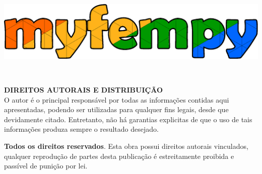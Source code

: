 \documentclass[
	14pt,				%
	openright,			%
	oneside
	a4paper,			%
	chapter=TITLE,		%
	section=TITLE,		%
	subsection=TITLE,	%
	subsubsection=TITLE,%
	english,			%
	french,				%
	spanish,			%
	brazil,				%
	sumario=tradicional
]{abntex2}
\begin{document}
\begin{titlingpage}
	
\phantom{xxx}
\vspace{0.5cm}
\huge
\raggedright
\centering 

\begin{center}
	\includegraphics[width=1\linewidth]{capa_v1}
\end{center}

\clearpage
\ABNTEXfontereduzida
\imprimirpreambulo\\
\vspace{1.0cm}
\raggedright
{\large \textbf{DIREITOS AUTORAIS E DISTRIBUIÇÃO}}\\
\vspace{0.5cm}
O autor é o principal responsável por todas as informações contidas aqui apresentadas, podendo ser utilizadas para qualquer fins legais, desde que devidamente citado. Entretanto, não há garantias explicitas de que o uso de tais informações produza sempre o resultado desejado.\\
\vspace{0.5cm}

\textbf{Todos os direitos reservados}. Esta obra possui direitos autorais vinculados, qualquer reprodução de partes desta publicação é estreitamente proibida e passível de punição por lei.\\
\vspace{0.5cm}


\end{titlingpage}
\end{document}
